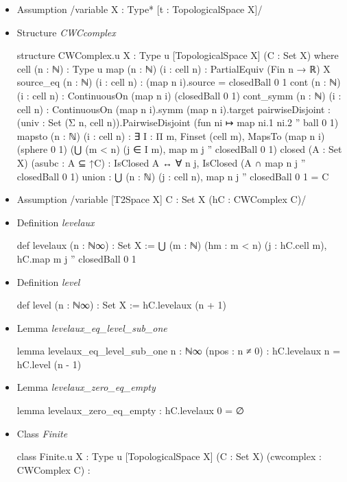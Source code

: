 \documentclass[colorinlistoftodos]{article}
\newcommand{\todonoturgentinline}[1]{\todo[inline, color=yellow]{#1}}
\begin{document}
\begin{itemize}
  \item Assumption \lean /variable {X : Type*} [t : TopologicalSpace X]/
  \item Structure \emph{CWCcomplex}
\begin{leancode}
structure CWComplex.{u} {X : Type u} [TopologicalSpace X] (C : Set X) where
  cell (n : ℕ) : Type u
  map (n : ℕ) (i : cell n) : PartialEquiv (Fin n → ℝ) X
  source_eq (n : ℕ) (i : cell n) : (map n i).source = closedBall 0 1
  cont (n : ℕ) (i : cell n) : ContinuousOn (map n i) (closedBall 0 1)
  cont_symm (n : ℕ) (i : cell n) : ContinuousOn (map n i).symm (map n i).target
  pairwiseDisjoint :
    (univ : Set (Σ n, cell n)).PairwiseDisjoint (fun ni ↦ map ni.1 ni.2 '' ball 0 1)
  mapsto (n : ℕ) (i : cell n) : ∃ I : Π m, Finset (cell m),
    MapsTo (map n i) (sphere 0 1) (⋃ (m < n) (j ∈ I m), map m j '' closedBall 0 1)
  closed (A : Set X) (asubc : A ⊆ ↑C) :
    IsClosed A ↔ ∀ n j, IsClosed (A ∩ map n j '' closedBall 0 1)
  union : ⋃ (n : ℕ) (j : cell n), map n j '' closedBall 0 1 = C
\end{leancode}
  \item Assumption \lean /variable [T2Space X] {C : Set X} (hC : CWComplex C)/
  \item Definition \emph{levelaux}
\begin{leancode}
def levelaux (n : ℕ∞) : Set X :=
  ⋃ (m : ℕ) (hm : m < n) (j : hC.cell m), hC.map m j '' closedBall 0 1
\end{leancode}
  \item Definition \emph{level}
\begin{leancode}
def level (n : ℕ∞) : Set X :=
  hC.levelaux (n + 1)
\end{leancode}
  \item Lemma \emph{levelaux\_eq\_level\_sub\_one}
\begin{leancode}
lemma levelaux_eq_level_sub_one {n : ℕ∞} (npos : n ≠ 0) : hC.levelaux n = hC.level (n - 1)
\end{leancode}
  \item Lemma \emph{levelaux\_zero\_eq\_empty}
\begin{leancode}
lemma levelaux_zero_eq_empty : hC.levelaux 0 = ∅
\end{leancode}
\todonoturgentinline{Add CW-Complex of finite type}
  \item Class \emph{Finite}
\begin{leancode}
class Finite.{u} {X : Type u} [TopologicalSpace X] (C : Set X) (cwcomplex : CWComplex C) :

\end{leancode}
\end{itemize}
\end{document}
